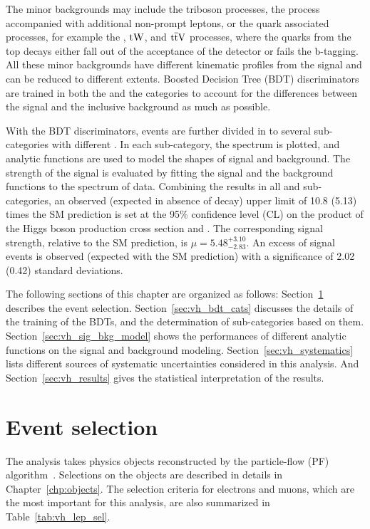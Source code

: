 The minor backgrounds may include the triboson processes, the \DY process accompanied with additional non-prompt leptons, 
or the \Pqt quark associated processes, for example the \ttbar, $\mathrm{t}\mathrm{W}$, and $\mathrm{t}\overline{\mathrm{t}}\mathrm{V}$ processes, 
where the \Pqb quarks from the top decays either fall out of the acceptance of the detector or fails the b-tagging. 
All these minor backgrounds have different kinematic profiles from the signal and can be reduced to different extents. 
Boosted Decision Tree (BDT) discriminators are trained in both the \WH and the \ZH categories to account for the differences between the signal and the inclusive background as much as possible.

With the BDT discriminators, events are further divided in to several sub-categories with different \SoB. 
In each sub-category, the \mmm spectrum is plotted, and analytic functions are used to model the shapes of signal and background.
The strength of the \hmm signal is evaluated by fitting the signal and the background functions to the \mmm spectrum of data.
Combining the results in all \WH and \ZH sub-categories, an observed (expected in absence of \hmm decay) upper limit of 10.8 (5.13) times the SM prediction 
is set at the 95\% confidence level (CL) on the product of the Higgs boson production cross section and \brhmm.
The corresponding signal strength, relative to the SM prediction, is $\mu = 5.48^{+3.10}_{-2.83}$.
An excess of signal events is observed (expected with the SM prediction) with a significance of 2.02 (0.42) standard deviations.

The following sections of this chapter are organized as follows: 
Section~\ref{sec:vh_event_selection} describes the event selection. 
Section~\ref{sec:vh_bdt_cats} discusses the details of the training of the BDTs, and the determination of sub-categories based on them.
Section~\ref{sec:vh_sig_bkg_model} shows the performances of different analytic functions on the signal and background modeling.
Section~\ref{sec:vh_systematics} lists different sources of systematic uncertainties considered in this analysis.
And Section~\ref{sec:vh_results} gives the statistical interpretation of the results.


\section{Event selection}\label{sec:vh_event_selection}
The \VH analysis takes physics objects reconstructed by the particle-flow (PF) algorithm~\cite{Sirunyan_2017}.
Selections on the objects are described in details in Chapter~\ref{chp:objects}.
The selection criteria for electrons and muons, which are the most important for this analysis, are also summarized in Table~\ref{tab:vh_lep_sel}.

